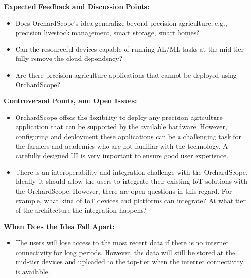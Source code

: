 \noindent
\textbf{Expected Feedback and Discussion Points:}
\begin{itemize}
    \item Does OrchardScope's idea generalize beyond precision agriculture, e.g., precision livestock management, smart storage, smart homes?
    \item Can the resourceful devices capable of running AL/ML tasks at the mid-tier fully remove the cloud dependency?
    \item Are there precision agriculture applications that cannot be deployed using OrchardScope?
\end{itemize}

\noindent
\textbf{Controversial Points, and Open Issues:}
\begin{itemize}
    \item OrchardScope offers the flexibility to deploy any precision agriculture application that can be supported by the available hardware. However, configuring and deployment these applications can be a challenging task for the farmers and academics who are not familiar with the technology. A carefully designed UI is very important to ensure good user experience. 
    \item There is an interoperability and integration challenge with the OrchardScope. Ideally, it should allow the users to integrate their existing IoT solutions with the OrchardScope. However, there are open questions in this regard. For example, what kind of IoT devices and platforms can integrate? At what tier of the architecture the integration happens? 
\end{itemize}

\noindent
\textbf{When Does the Idea Fall Apart:}
\begin{itemize}
    \item The users will lose access to the most recent data if there is no internet connectivity for long periods. However, the data will still be stored at the mid-tier devices and uploaded to the top-tier when the internet connectivity is available. 
\end{itemize}